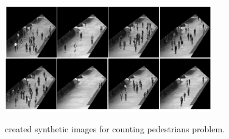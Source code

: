 \begin{enumerate}
\begin{figure}[H]
	\centering
	{\includegraphics[width=0.8\textwidth]{images/myped}}
	\caption{created synthetic images for counting pedestrians problem.}
	\label{fig:myped}
\end{figure}

\end{enumerate}

